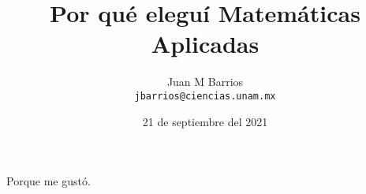 \documentclass{article}
\title{Por qué eleguí Matemáticas Aplicadas}
\author{Juan M Barrios\\
        \texttt{jbarrios@ciencias.unam.mx}}
\date{21 de septiembre del 2021}
\begin{document}
  \maketitle
  Porque me gustó.
\end{document}
